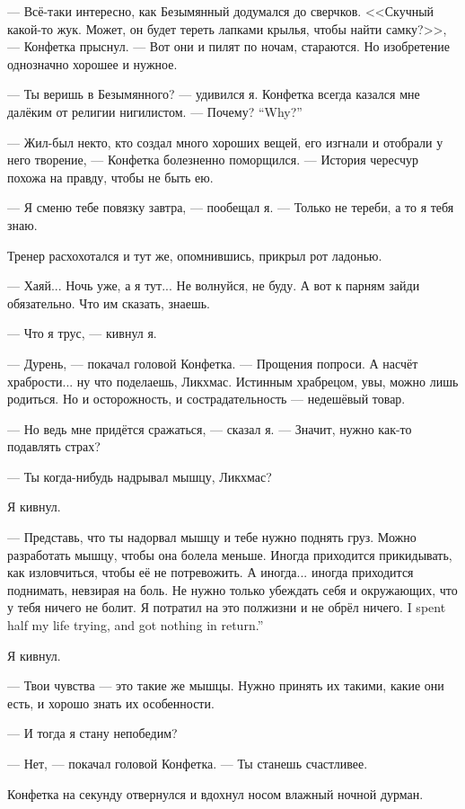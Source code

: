 --- Всё-таки интересно, как Безымянный додумался до сверчков.
<<Скучный какой-то жук.
Может, он будет тереть лапками крылья, чтобы найти самку?>>, --- Конфетка прыснул.
--- Вот они и пилят по ночам, стараются.
Но изобретение однозначно хорошее и нужное.

--- Ты веришь в Безымянного? --- удивился я.
Конфетка всегда казался мне далёким от религии нигилистом.
{--- Почему?}
{``Why?''}

--- Жил-был некто, кто создал много хороших вещей, его изгнали и отобрали у него творение, --- Конфетка болезненно поморщился.
--- История чересчур похожа на правду, чтобы не быть ею.

--- Я сменю тебе повязку завтра, --- пообещал я.
--- Только не тереби, а то я тебя знаю.

Тренер расхохотался и тут же, опомнившись, прикрыл рот ладонью.

--- Хаяй...
Ночь уже, а я тут...
Не волнуйся, не буду.
А вот к парням зайди обязательно.
Что им сказать, знаешь.

--- Что я трус, --- кивнул я.

--- Дурень, --- покачал головой Конфетка.
--- Прощения попроси.
А насчёт храбрости... ну что поделаешь, Ликхмас.
Истинным храбрецом, увы, можно лишь родиться.
Но и осторожность, и сострадательность --- недешёвый товар.

--- Но ведь мне придётся сражаться, --- сказал я.
--- Значит, нужно как-то подавлять страх?

--- Ты когда-нибудь надрывал мышцу, Ликхмас?

Я кивнул.

--- Представь, что ты надорвал мышцу и тебе нужно поднять груз.
Можно разработать мышцу, чтобы она болела меньше.
Иногда приходится прикидывать, как изловчиться, чтобы её не потревожить.
А иногда... иногда приходится поднимать, невзирая на боль.
Не нужно только убеждать себя и окружающих, что у тебя ничего не болит.
{Я потратил на это полжизни и не обрёл ничего.}
{I spent half my life trying, and got nothing in return.''}

Я кивнул.

--- Твои чувства --- это такие же мышцы.
Нужно принять их такими, какие они есть, и хорошо знать их особенности.

--- И тогда я стану непобедим?

--- Нет, --- покачал головой Конфетка.
--- Ты станешь счастливее.

Конфетка на секунду отвернулся и вдохнул носом влажный ночной дурман.

